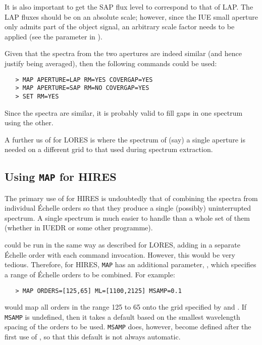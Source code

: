 It is also important to get the SAP flux level to correspond to that of LAP\@.
The LAP fluxes should be on an absolute scale; however, since the IUE small
aperture only admits part of the object signal, an arbitrary scale factor
needs to be applied (see the 
 parameter in )\@.

Given that the spectra from the two apertures are indeed similar (and hence
justify being averaged), then the following commands could be used:

\begin{verbatim}
   > MAP APERTURE=LAP RM=YES COVERGAP=YES
   > MAP APERTURE=SAP RM=NO COVERGAP=YES
   > SET RM=YES
\end{verbatim}

Since the spectra are similar, it is probably valid to fill gaps in one
spectrum using the other.

A further us of 
 for LORES is where the spectrum of (say) a single
aperture is needed on a different grid to that used during spectrum
extraction.


\subsection{Using {\tt MAP} for HIRES}

The primary use of 
 for HIRES is undoubtedly that of combining the
spectra from individual \'{E}chelle orders so that they produce a single
(possibly) uninterrupted spectrum.  A single spectrum is much easier to handle
than a whole set of them (whether in IUEDR or some other programme)\@.

 could be run in the same way as described for LORES, adding in a
separate \'{E}chelle order with each command invocation.  However, this would be
very tedious.  Therefore, for HIRES, \verb+MAP+ has an additional parameter,
, which specifies a range of
\'{E}chelle orders to be combined. For example:

\begin{verbatim}
   > MAP ORDERS=[125,65] ML=[1100,2125] MSAMP=0.1
\end{verbatim}

would map all orders in the range 125 to 65 onto the grid specified by
 and \@.
If \verb+MSAMP+ is undefined, then it takes a
default based on the smallest wavelength spacing of the orders to be used.
\verb+MSAMP+ does, however, become defined after the first use of
, so that this default is not always automatic.

